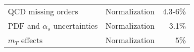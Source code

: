 \begin{table}[h]
\begin{tabular}{lrr}
\multicolumn{1}{l|}{QCD missing orders}                                                   & \multicolumn{1}{r|}{Normalization} & 4.3-6\%                   \\ \cline{2-2}
\multicolumn{1}{l|}{PDF and $\alpha_{s}$ uncertainties}                                   & \multicolumn{1}{r|}{Normalization} & 3.1\%                     \\ \cline{2-2}
\multicolumn{1}{l|}{$m_{T}$ effects}                                                      & \multicolumn{1}{r|}{Normalization} & 5\%                       \\ \hline
\end{tabular}
\end{table}

